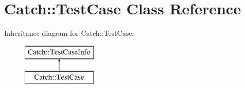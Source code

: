 \hypertarget{class_catch_1_1_test_case}{}\section{Catch\+:\+:Test\+Case Class Reference}
\label{class_catch_1_1_test_case}
Inheritance diagram for Catch\+:\+:Test\+Case\+:\begin{figure}[H]
\begin{center}
\leavevmode
\includegraphics[height=2.000000cm]{class_catch_1_1_test_case}
\end{center}
\end{figure}

